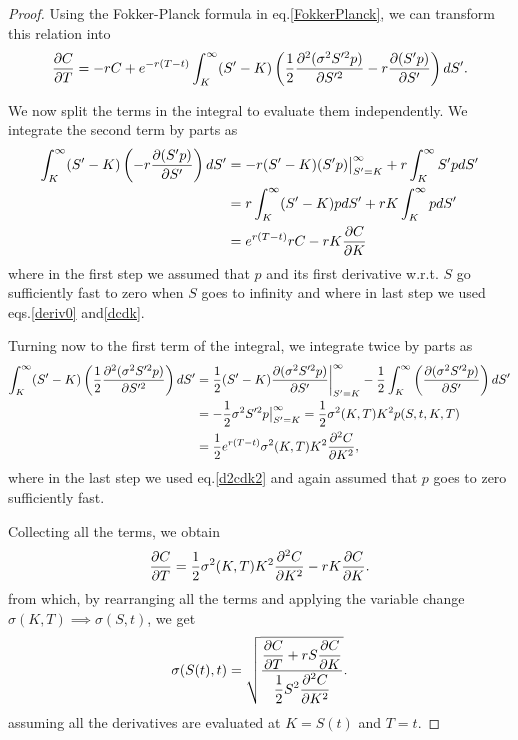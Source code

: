 \begin{proof}
Using the Fokker-Planck formula in eq.\eqref{FokkerPlanck}, we can transform this relation into
\begin{equation}
\pdv{C}{T}=-rC+e^{-r(T-t)}\int_K^\infty(S'-K)\left(\frac{1}{2}\pdv{^2(\sigma^2S'^2p)}{S'^2}-r\pdv{(S'p)}{S'}\right)dS'.
\end{equation}

We now split the terms in the integral to evaluate them independently. We integrate the second term by parts as
\begin{equation}
\begin{split}
\int_K^\infty(S'-K)\left(-r\pdv{(S'p)}{S'}\right)dS'&=-r(S'-K)(S'p)\big|_{S'=K}^\infty+r\int_K^\infty S'p dS'\\
&=r\int_K^\infty (S'-K)p dS'+rK\int_K^\infty p dS'\\
&=e^{r(T-t)}rC-rK\pdv{C}{K}
\end{split}
\end{equation}
\noindent where in the first step we assumed that $p$ and its first derivative w.r.t. $S$ go sufficiently fast to zero when $S$ goes to infinity and where in last step we used eqs.\eqref{deriv0} and\eqref{dcdk}.

Turning now to the first term of the integral, we integrate twice by parts as
\begin{equation}
\begin{split}
\int_K^\infty(S'-K)\left(\frac{1}{2}\pdv{^2(\sigma^2S'^2p)}{S'^2}\right)dS'&=\frac{1}{2}(S'-K)\pdv{(\sigma^2S'^2p)}{S'}\bigg|_{S'=K}^\infty-\frac{1}{2}\int_K^\infty\left(\pdv{(\sigma^2S'^2p)}{S'}\right)dS'\\
&=-\frac{1}{2}\sigma^2S'^2p\big|_{S'=K}^\infty=\frac{1}{2}\sigma^2(K,T)K^2p(S,t,K,T)\\
&=\frac{1}{2}e^{r(T-t)}\sigma^2(K,T)K^2\pdv{^2C}{K^2},
\end{split}
\end{equation}
\noindent where in the last step we used eq.\eqref{d2cdk2} and again assumed that $p$ goes to zero sufficiently fast.

Collecting all the terms, we obtain
\begin{equation}
\pdv{C}{T}=\frac{1}{2}\sigma^2(K,T)K^2\pdv{^2C}{K^2}-rK\pdv{C}{K}.
\end{equation}
\noindent from which, by rearranging all the terms and applying the variable change $\sigma(K,T)\implies \sigma(S,t)$, we get
\begin{equation}
\sigma(S(t),t)=\sqrt{\frac{\displaystyle\pdv{C}{T}+rS\pdv{C}{K}}{\displaystyle\frac{1}{2}S^2\pdv{^2C}{K^2}}}.
\end{equation}
\noindent assuming all the derivatives are evaluated at $K=S(t)$ and $T=t$.

\end{proof}


